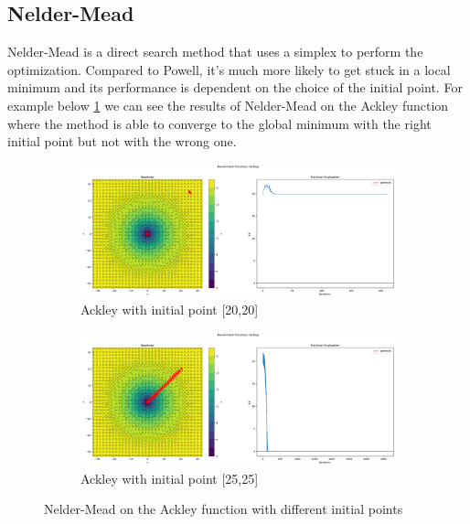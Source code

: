 \subsection{Nelder-Mead}
\label{sec:nelder-mead}
Nelder-Mead is a direct search method that uses a simplex to perform the optimization. Compared to Powell, it's much more likely to get stuck in a local minimum and its performance is dependent on the choice of the initial point. For example below \ref{fig:nm-ackley} we can see the results of Nelder-Mead on the Ackley function where the method is able to converge to the global minimum with the right initial point but not with the wrong one.
\begin{figure}[H]
    \begin{subfigure}{0.5\textwidth}
        \includegraphics[width=\textwidth]{lab1/imgs/nm_ackley_20.png}
        \caption{Ackley with initial point [20,20]}
    \end{subfigure}
    \begin{subfigure}{0.5\textwidth}
        \includegraphics[width=\textwidth]{lab1/imgs/nm_ackley_25.png}
        \caption{Ackley with initial point [25,25]}
    \end{subfigure}
    \caption{Nelder-Mead on the Ackley function with different initial points}
    \label{fig:nm-ackley}
\end{figure}

